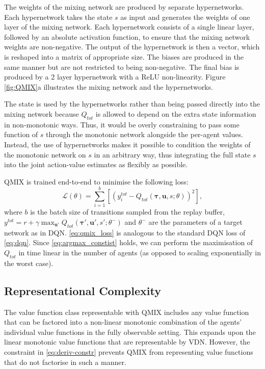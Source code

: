 \documentclass{article}
\begin{document}
The weights of the mixing network are produced by separate hypernetworks. Each hypernetwork takes the state $s$ as input and generates the weights of one layer of the mixing network. Each hypernetwork consists of a single linear layer, followed by an absolute activation function, to ensure that the mixing network weights are non-negative. The output of the hypernetwork is then a vector, which is reshaped into a matrix of appropriate size. The biases are produced in the same manner but are not restricted to being non-negative. The final bias is produced by a 2 layer hypernetwork with a ReLU non-linearity. Figure \ref{fig:QMIX}a illustrates the mixing network and the hypernetworks.

The state is used by the hypernetworks rather than being passed directly into the mixing network because $Q_{tot}$ is allowed to depend on the extra state 
information in non-monotonic ways. Thus, it would be overly constraining to pass some function of $s$ through the monotonic network alongside the 
per-agent values.
Instead, the use of hypernetworks makes it possible to condition the 
weights of the monotonic network on $s$ in an arbitrary way, thus 
integrating the full state $s$ into the joint action-value estimates as 
flexibly as possible.


QMIX is trained end-to-end to minimise the following loss:
\begin{equation}\label{eq:qmix_loss}
\mathcal{L}(\theta)=\sum\limits_{i=1}^b\left[\left(y_i^{tot} - Q_{tot}(\boldsymbol{\tau}, \mathbf{u}, s; \theta) \right)^2\right],
\end{equation} 
where $b$ is the batch size of transitions sampled from the replay buffer, $y^{tot} = r+\gamma\max_{\mathbf{u}'} Q_{tot}(\boldsymbol{\tau}', \mathbf{u}', s'; \theta^-)$ and $\theta^-$ are the parameters of a target network as in DQN. 
\eqref{eq:qmix_loss} is analogous to the standard DQN loss of \eqref{eq:dqn}. Since \eqref{eq:argmax_constist} holds, we can perform the maximisation of $Q_{tot}$ in time linear in the number of agents (as opposed to scaling exponentially in the worst case). 

\subsection{Representational Complexity}

The value function class representable with QMIX includes any value function that can be factored into a non-linear monotonic combination of the agents' individual value functions in the fully observable setting. 
This expands upon the linear monotonic value functions that are representable by VDN. 
However, the constraint in \eqref{eq:deriv-constr} prevents QMIX from representing value functions that do not factorise in such a manner. 
\end{document}
